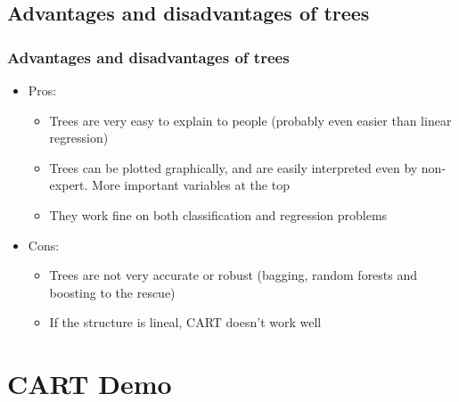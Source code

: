 \documentclass[
  shownotes,
  xcolor={svgnames},
  hyperref={colorlinks,citecolor=DarkBlue,linkcolor=DarkRed,urlcolor=DarkBlue}
  ]{beamer}
\begin{document}
\subsection{Advantages and disadvantages of trees}
\begin{frame}[fragile]
\frametitle{Advantages and disadvantages of trees}

\begin{itemize}
\item Pros: 
  \begin{itemize}
    \item Trees are very easy to explain to people (probably even easier than linear regression)
    \medskip
    \item Trees can be plotted graphically, and are easily interpreted even by non-expert. More important variables at the top
    \medskip
    \item They work fine on both classification and regression problems
  \end{itemize}

\bigskip
\item  Cons:
  \begin{itemize}
    \item Trees are not very accurate or robust (bagging, random forests and boosting to the rescue)
    \medskip
    \item If the structure is lineal, CART doesn't work well
  \end{itemize}
\end{itemize}

\end{frame}

\section{CART Demo}
\end{document}
